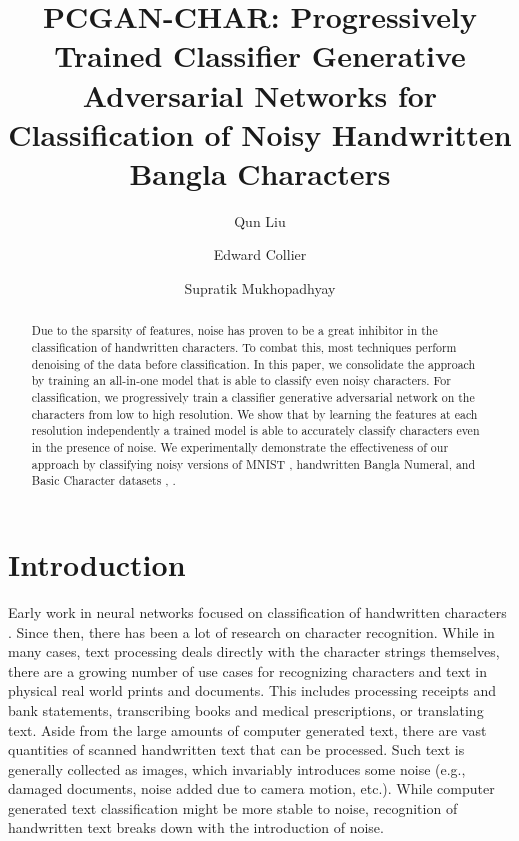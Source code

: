 \documentclass[runningheads]{llncs}
\begin{document}
\title{PCGAN-CHAR: Progressively Trained Classifier Generative Adversarial Networks for Classification of Noisy Handwritten Bangla Characters}
\author{Qun Liu \and
Edward Collier \and
Supratik Mukhopadhyay}
\maketitle              \begin{abstract}
Due to the sparsity of features, noise has proven to be a great inhibitor in the  classification of handwritten characters. To combat this, most techniques perform denoising of the data before classification. In this paper, we consolidate the approach by training an all-in-one model that is able to classify even noisy characters. For classification, we progressively train a classifier generative adversarial network   on the characters from low to high resolution. We show that by learning the features at each resolution independently a trained model is able to accurately classify characters even in the presence of noise. We experimentally demonstrate the effectiveness of our approach by  classifying  noisy versions of MNIST \cite{Karki18},  handwritten Bangla Numeral, and Basic Character datasets \cite{bhattacharya2009handwritten}, \cite{bhattacharya2012offline}.

\end{abstract}
\section{Introduction}
Early work in neural networks focused on classification of handwritten characters \cite{lecun1998gradient, lecun1989backpropagation}. Since then,  there has been a lot of research  on  character recognition. While in many cases, text processing  deals directly with the character strings themselves, there are a growing number of use cases for recognizing characters and text in physical real world prints and documents. This  includes processing receipts and bank statements, transcribing books and medical prescriptions,  or translating text. Aside from the large amounts of computer generated text, there are vast quantities of scanned handwritten text that can be processed. Such text is generally collected as images, which invariably introduces some noise (e.g., damaged documents, noise added due to camera motion, etc.). While computer generated text classification might be more stable to noise,  recognition of handwritten text  breaks down with the introduction of noise.
\end{document}
